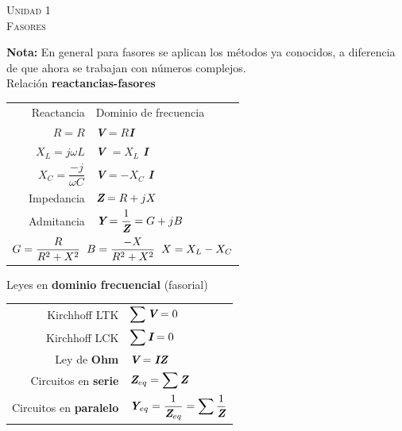 \documentclass[11pt,a4paper,twocolumn]{article}
\newcommand{\fasor}[1]{\textit{\textbf{#1}}}
\newcommand{\unidad}[2]{\begin{center}
		\fontsize{10}{10}\selectfont\color{gray!50!black}\scshape Unidad #1 \\
		\fontsize{14}{14}\selectfont \scshape #2
\end{center} \vspace{-.6cm}}
\begin{document}

\unidad{1}{Fasores}

	\begin{tcolorbox}[colback=white!97!brown, colframe=brown!15!gray]
		
	\textbf{Nota:} En general  para fasores se aplican los métodos ya conocidos, a diferencia de que ahora se trabajan con números complejos.\\

		
		Relación \textbf{reactancias-fasores }
\begin{center}		
		\begin{tabular}{r l}
			
			Reactancia &    Dominio de frecuencia\\ 
			$R=R$ & \fasor{V}$=R$\fasor{I}\\
			$ X_{L}= j \omega L $ & \fasor{V} $=X_{L}$ \fasor{I} \\
			$X_{C} = \dfrac{-j}{\omega C}$ & \fasor{V}$= - X_{C}$ \fasor{I} \\ \vspace{.1cm}
			Impedancia & $\fasor{Z}= R +j X$ \\
			Admitancia & $\fasor{Y} =\dfrac{1}{\fasor{Z}}=G + jB$ \\ 
			\multicolumn{2}{c}{$ G = \dfrac{R}{R^2+X^2} \hspace{.2cm} B=\dfrac{-X}{R^2+X^2} \hspace{.2cm} X=X_{L}-X_{C} $}
			\end{tabular}
\end{center}



	Leyes en \textbf{dominio frecuencial} (fasorial) \vspace{.1cm}

		\begin{tabular}{r l} \vspace{.1cm}
		Kirchhoff LTK & $\displaystyle\sum \fasor{V}=0$ \\ \vspace{.1cm}
		Kirchhoff LCK & $\displaystyle\sum \fasor{I}=0$ \\
		Ley de \textbf{Ohm} & $\fasor{V}=\fasor{I}\fasor{Z}$\\
		\vspace{.1cm}
		Circuitos en \textbf{serie} & 	$\fasor{Z}_{eq}=\displaystyle\sum \fasor{Z}$ \\ 
		Circuitos en \textbf{paralelo} & $\fasor{Y}_{eq}=\dfrac{1}{\fasor{Z}_{eq}}=\displaystyle\sum \dfrac{1}{\fasor{Z}}$ \\
		


\end{tabular}
\end{tcolorbox}
\end{document}
